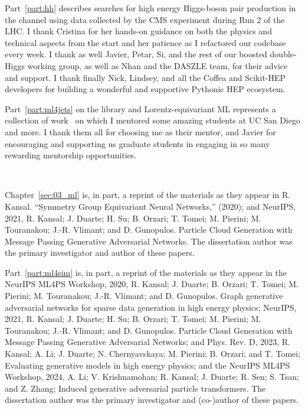 \begin{acknowledgements}
Part~\ref{part:hh} describes searches for high energy Higgs-boson pair production in the \bbvv channel using data collected by the CMS experiment during Run 2 of the LHC.
I thank Cristina for her hands-on guidance on both the physics and technical aspects from the start and her patience as I refactored our codebase every week.
I thank as well Javier, Petar, Si, and the rest of our boosted double-Higgs working group, as well as Nhan and the DASZLE team, for their advice and support.
I thank finally Nick, Lindsey, and all the Coffea and Scikit-HEP developers for building a wonderful and supportive Pythonic HEP ecosystem.

Part~\ref{part:ml4jets} on the \jetnet library and Lorentz-equivariant ML represents a collection of work~\cite{Kansal:2023iqy, Tsan:2021brw, Hao:2022zns} on which I mentored some amazing students at UC San Diego and more.
I thank them all
for choosing me as their mentor, and Javier for encouraging and supporting us graduate students in engaging in so many rewarding mentorship opportunities. 

\

Chapter~\ref{sec:03_ml} is, in part, a reprint of the materials as they appear in
R. Kansal. ``Symmetry Group Equivariant Neural Networks,'' (2020);
and
NeurIPS, 2021, R. Kansal; J. Duarte; H. Su; B. Orzari; T. Tomei; M. Pierini; M. Touranakou; J.-R. Vlimant; and D. Gunopulos. Particle Cloud Generation with Message Passing Generative Adversarial Networks.
The dissertation author was the primary investigator and author of these papers.

Part~\ref{part:ml4sim} is, in part, a reprint of the materials as they appear in 
the NeurIPS ML4PS Workshop, 2020, R. Kansal; J. Duarte; B. Orzari; T. Tomei; M. Pierini; M. Touranakou; J.-R. Vlimant; and D. Gunopulos. Graph generative adversarial networks for sparse data generation in high energy physics;
NeurIPS, 2021, R. Kansal; J. Duarte; H. Su; B. Orzari; T. Tomei; M. Pierini; M. Touranakou; J.-R. Vlimant; and D. Gunopulos. Particle Cloud Generation with Message Passing Generative Adversarial Networks; and
Phys. Rev. D, 2023, R. Kansal; A. Li; J. Duarte; N. Chernyavskaya; M. Pierini; B. Orzari; and T. Tomei; Evaluating generative models in high energy physics; and
the NeurIPS ML4PS Workshop, 2024, A. Li; V. Krishnamohan; R. Kansal; J. Duarte; R. Sen; S. Tsan; and Z. Zhang; Induced generative adversarial particle transformers.
The dissertation author was the primary investigator and (co-)author of these papers.


\end{acknowledgements}
